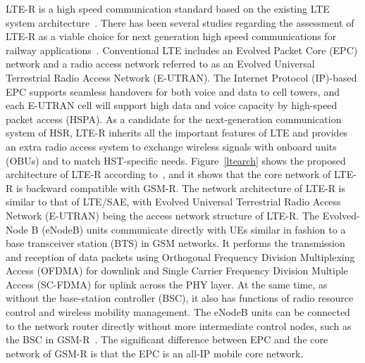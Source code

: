 LTE-R is a high speed communication standard based on the existing LTE system architecture~\cite{inplter4}. There has been several studies regarding the assessment of LTE-R as a viable choice for next generation high speed communications for railway applications~\cite{inplter5,inplter6}. Conventional LTE includes an Evolved Packet Core (EPC) network and a radio access network referred to as an Evolved Universal  Terrestrial  Radio  Access  Network (E-UTRAN). The  Internet  Protocol (IP)-based  EPC  supports  seamless handovers for both voice and data to cell towers, and each E-UTRAN cell will support high data and voice capacity by high-speed  packet  access  (HSPA).  As  a  candidate for the next-generation  communication  system  of  HSR,  LTE-R  inherits all the important features of LTE and provides an extra radio access system to exchange wireless signals with onboard  units (OBUs)  and to match HST-specific  needs. Figure~\ref{ltearch} shows the proposed architecture of LTE-R according to~\cite{trlter2}, and it shows that the core network of LTE-R is backward compatible with GSM-R. The network architecture of LTE-R is similar to that of LTE/SAE, with  Evolved Universal Terrestrial Radio Access Network (E-UTRAN) being the access network structure of LTE-R. The Evolved-Node B (eNodeB) units communicate directly with UEs similar in fashion to a base transceiver station (BTS) in GSM networks. It performs the transmission and reception of data packets using Orthogonal Frequency Division Multiplexing Access (OFDMA) for downlink and Single Carrier Frequency Division Multiple Access (SC-FDMA) for uplink across the PHY layer. At the same time, as without the base-station controller (BSC), it also has functions of  radio  resource  control and wireless  mobility  management.  The eNodeB units can be connected to the network router directly without more intermediate control nodes, such as the BSC in GSM-R~\cite{tingting2010high}. The significant difference between EPC and the core network of GSM-R is that the EPC is an all-IP mobile core network.

